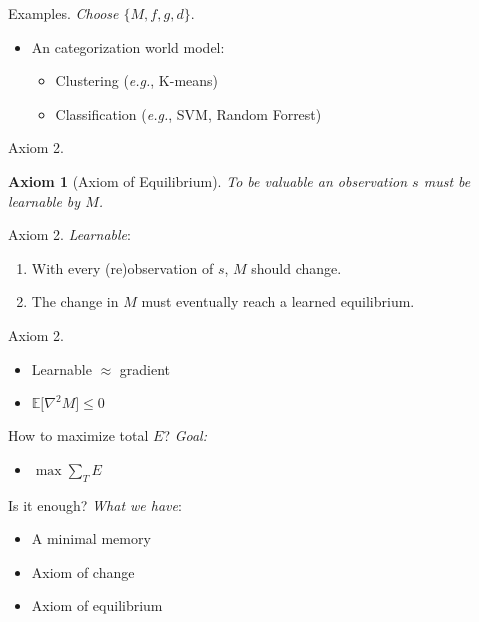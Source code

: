 \documentclass[10pt]{beamer}
\newtheorem{axiom}{Axiom}
\begin{document}
\begin{frame}[fragile]{Examples.}
\textit{Choose $\{M, f, g, d\}$}.
\begin{itemize}
    \item An categorization world model:
    \begin{itemize}
        \item Clustering (\textit{e.g.}, K-means)
        \item Classification (\textit{e.g.}, SVM, Random Forrest)
    \end{itemize}
\end{itemize}
\end{frame}

\begin{frame}[fragile]{Axiom 2.}
\begin{axiom}
	[Axiom of Equilibrium] To be valuable an observation $s$ must be learnable by $M$. 
\label{ax:5} 
\end{axiom}
\end{frame}

\begin{frame}[fragile]{Axiom 2.}
\textit{Learnable}: 
\begin{enumerate}
    \item With every (re)observation of $s$, $M$ should change.
    \item The change in $M$ must eventually reach a learned equilibrium. 
\end{enumerate}
\end{frame}

\begin{frame}[fragile]{Axiom 2.}
\begin{itemize}
\item Learnable $\approx$ gradient
\item $\mathbb{E}\big [\nabla^2 M \big ] \leq 0$
\end{itemize}
\end{frame}

\begin{frame}[fragile]{How to maximize total $E$?}
\textit{Goal:}
\begin{itemize}
\item $\max \sum_T E$
\end{itemize}
\end{frame}

\begin{frame}[fragile]{Is it enough?}
\textit{What we have}:
\begin{itemize}
\item A minimal memory
\item Axiom of change
\item Axiom of equilibrium
\end{itemize}
\end{frame}
\end{document}

